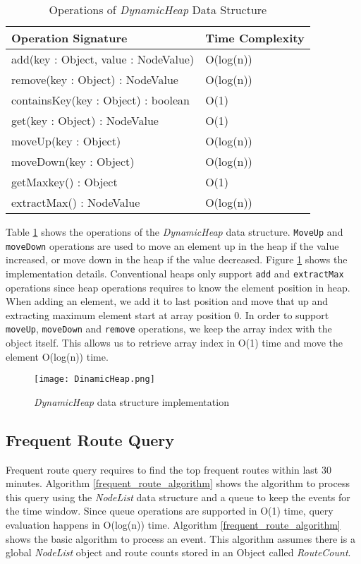 \begin{table}
\centering
\caption{Operations of \textit{DynamicHeap} Data Structure}
\begin{tabular}{|l|l|} \hline
Operation Signature & Time Complexity \\ \hline \hline
add(key : Object, value : NodeValue) & O(log(n)) \\ \hline
remove(key : Object) : NodeValue & O(log(n)) \\ \hline
containsKey(key : Object) : boolean & O(1) \\ \hline
get(key : Object) : NodeValue & O(1) \\ \hline
moveUp(key : Object) & O(log(n)) \\ \hline
moveDown(key : Object) & O(log(n)) \\ \hline
getMaxkey() : Object & O(1) \\ \hline
extractMax() : NodeValue & O(log(n)) \\ \hline
\end{tabular}
\label{dynamicheap_api}
\end{table}

Table \ref{dynamicheap_api} shows the operations of the \textit{DynamicHeap} data structure. \texttt{MoveUp} and \texttt{moveDown} operations are used to move an element up in the heap if the value increased, or move down in the heap if the value decreased. Figure \ref{dynamicheap_impl} shows the implementation details. Conventional heaps only support \texttt{add} and \texttt{extractMax} operations since heap operations requires to know the element position in heap. When adding an element, we add it to last position and move that up and extracting maximum element start at array position 0. In order to support \texttt{moveUp}, \texttt{moveDown} and \texttt{remove} operations, we keep the array index with the object itself. This allows us to retrieve array index in O(1) time and move the element O(log(n)) time.


\begin{figure}[!t]
        \centering
        \texttt{[image: DinamicHeap.png]}
        \caption{\textit{DynamicHeap} data structure implementation}
        \label{dynamicheap_impl}
\end{figure}

\subsection{Frequent Route Query}

Frequent route query requires to find the top frequent routes within last 30 minutes. Algorithm \ref{frequent_route_algorithm} shows the algorithm to process this query using the \textit{NodeList} data structure and a queue to keep the events for the time window.  Since queue operations are supported in O(1) time, query evaluation happens in O(log(n)) time. Algorithm \ref{frequent_route_algorithm} shows the basic algorithm to process an event. This algorithm assumes there is a global \textit{NodeList} object and route counts stored in an Object called \textit{RouteCount}. 

